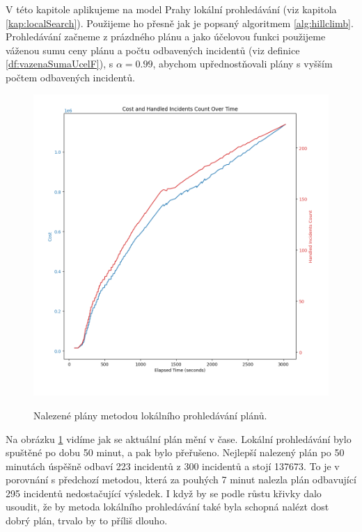 V této kapitole aplikujeme na model Prahy lokální prohledávání (viz kapitola \ref{kap:localSearch}).
Použijeme ho přesně jak je popsaný algoritmem \ref{alg:hillclimb}.
Prohledávání začneme z prázdného plánu a jako účelovou funkci použijeme váženou sumu ceny plánu a počtu odbavených incidentů (viz definice \ref{df:vazenaSumaUcelF}), s $\alpha = 0.99$, abychom
upřednostňovali plány s vyšším počtem odbavených incidentů.

\begin{figure}[H]
  \caption{Nalezené plány metodou lokálního prohledávání plánů.}
  \includegraphics[width=\textwidth]{img/local_search_empty_plan_plot.png}
  \centering
  \label{img:localSearchRes}
\end{figure}

Na obrázku \ref{img:localSearchRes} vidíme jak se aktuální plán mění v čase.
Lokální prohledávání bylo spuštěné po dobu 50 minut, a pak bylo přeřušeno. 
Nejlepší nalezený plán po 50 minutách úspěšně odbaví 223 incidentů z 300 incidentů a stojí 137673.
To je v porovnání s předchozí metodou, která za pouhých 7 minut nalezla plán odbavující 295 incidentů nedostačující výsledek.
I když by se podle růstu křivky dalo usoudit, že by metoda lokálního prohledávání také byla schopná nalézt dost dobrý plán, trvalo by to příliš dlouho.

